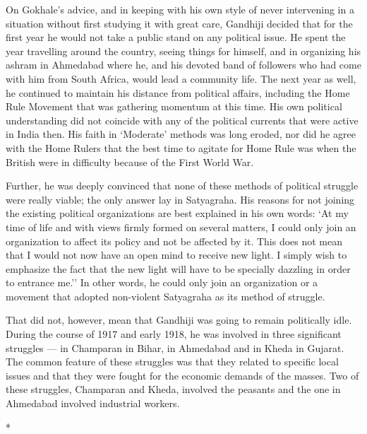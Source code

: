 On Gokhale's advice, and in keeping with his own style of never intervening in a situation without first studying it with great care, Gandhiji decided that for the first year he would not take a public stand on any political issue. He spent the year travelling around the country, seeing things for himself, and in organizing his ashram in Ahmedabad where he, and his devoted band of followers who had come with him from South Africa, would lead a community life. The next year as well, he continued to maintain his distance from political affairs, including the Home Rule Movement that was gathering momentum at this time. His own political understanding did not coincide with any of the political currents that were active in India then. His faith in `Moderate' methods was long eroded, nor did he agree with the Home Rulers that the best time to agitate for Home Rule was when the British were in difficulty because of the First World War.

Further, he was deeply convinced that none of these methods of political struggle were really viable; the only answer lay in Satyagraha. His reasons for not joining the existing political organizations are best explained in his own words: `At my time of life and with views firmly formed on several matters, I could only join an organization to affect its policy and not be affected by it. This does not mean that I would not now have an open mind to receive new light. I simply wish to emphasize the fact that the new light will have to be specially dazzling in order to entrance me.'' In other words, he could only join an organization or a movement that adopted non-violent Satyagraha as its method of struggle.

That did not, however, mean that Gandhiji was going to remain politically idle. During the course of 1917 and early 1918, he was involved in three significant struggles --- in Champaran in Bihar, in Ahmedabad and in Kheda in Gujarat. The common feature of these struggles was that they related to specific local issues and that they were fought for the economic demands of the masses. Two of these struggles, Champaran and Kheda, involved the peasants and the one in Ahmedabad involved industrial workers.

\begin{center}*\end{center}

\paragraph*{}



